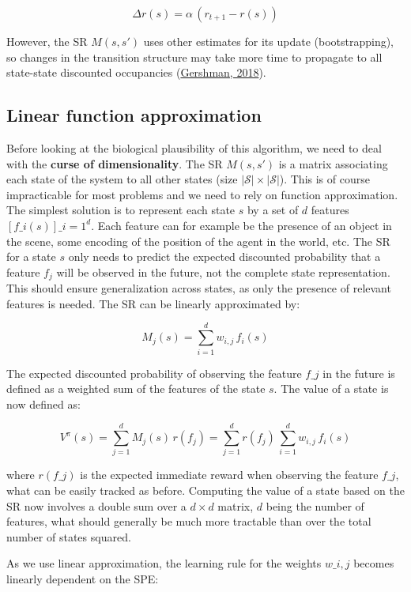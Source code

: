 \documentclass[
  11pt,
]{article}
\begin{document}
\[
    \Delta r(s) = \alpha \, (r_{t+1} - r(s))
\]

However, the SR \(M(s, s')\) uses other estimates for its update
(bootstrapping), so changes in the transition structure may take more
time to propagate to all state-state discounted occupancies
(\protect\hyperlink{ref-Gershman2018}{Gershman, 2018}).

\hypertarget{linear-function-approximation}{%
\subsection{Linear function
approximation}\label{linear-function-approximation}}

Before looking at the biological plausibility of this algorithm, we need
to deal with the \textbf{curse of dimensionality}. The SR \(M(s, s')\)
is a matrix associating each state of the system to all other states
(size \(|\mathcal{S}| \times |\mathcal{S}|\)). This is of course
impracticable for most problems and we need to rely on function
approximation. The simplest solution is to represent each state \(s\) by
a set of \(d\) features \([f\_i(s)]\_{i=1}^d\). Each feature can for
example be the presence of an object in the scene, some encoding of the
position of the agent in the world, etc. The SR for a state \(s\) only
needs to predict the expected discounted probability that a feature
\(f_j\) will be observed in the future, not the complete state
representation. This should ensure generalization across states, as only
the presence of relevant features is needed. The SR can be linearly
approximated by:

\[
    M_j(s) = \sum_{i=1}^d w_{i, j} \, f_i(s)
\]

The expected discounted probability of observing the feature \(f\_j\) in
the future is defined as a weighted sum of the features of the state
\(s\). The value of a state is now defined as:

\[
    V^\pi(s) = \sum_{j=1}^d M_j(s) \, r(f_j) = \sum_{j=1}^d r(f_j) \, \sum_{i=1}^d w_{i, j} \, f_i(s)
\]

where \(r(f\_j)\) is the expected immediate reward when observing the
feature \(f\_j\), what can be easily tracked as before. Computing the
value of a state based on the SR now involves a double sum over a
\(d \times d\) matrix, \(d\) being the number of features, what should
generally be much more tractable than over the total number of states
squared.

As we use linear approximation, the learning rule for the weights
\(w\_{i, j}\) becomes linearly dependent on the SPE:
\end{document}
